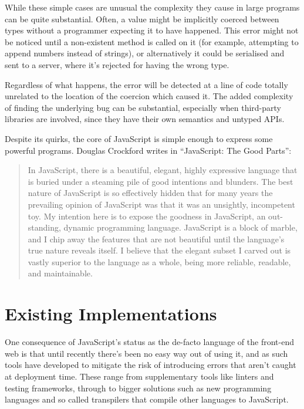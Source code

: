 \documentclass[british, twoside, openright]{bhamthesis}
\theoremstyle{definition}
\begin{document}
    While these simple cases are unusual the complexity they cause in large programs can be quite substantial. Often, a value might be implicitly coerced between types without a programmer expecting it to have happened. This error might not be noticed until a non-existent method is called on it (for example, attempting to append numbers instead of strings), or alternatively it could be serialised and sent to a server, where it's rejected for having the wrong type.

    Regardless of what happens, the error will be detected at a line of code totally unrelated to the location of the coercion which caused it. The added complexity of finding the underlying bug can be substantial, especially when third-party libraries are involved, since they have their own semantics and untyped APIs.

    Despite its quirks, the core of JavaScript is simple enough to express some powerful programs. Douglas Crockford writes in “JavaScript: The Good Parts”:

    \begin{quote}
      In JavaScript, there is a beautiful, elegant, highly expressive language that is buried under a steaming pile of good intentions and blunders. The best nature of JavaScript is so effectively hidden that for many years the prevailing opinion of JavaScript was that it was an unsightly, incompetent toy. My intention here is to expose the goodness in JavaScript, an out- standing, dynamic programming language. JavaScript is a block of marble, and I chip away the features that are not beautiful until the language’s true nature reveals itself. I believe that the elegant subset I carved out is vastly superior to the language as a whole, being more reliable, readable, and maintainable.
    \end{quote}
    \autocite{Crockford2008}

  \section{Existing Implementations}
    One consequence of JavaScript's status as the de-facto language of the front-end web is that until recently there's been no easy way out of using it, and as such tools have developed to mitigate the risk of introducing errors that aren't caught at deployment time. These range from supplementary tools like linters and testing frameworks, through to bigger solutions such as new programming languages and so called transpilers that compile other languages to JavaScript.
\end{document}
